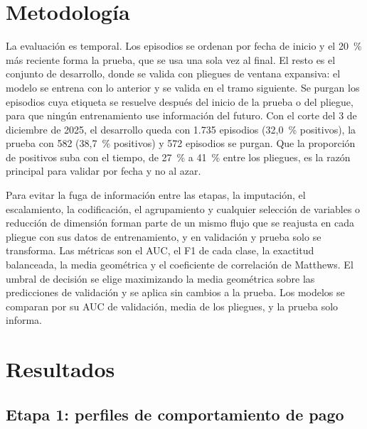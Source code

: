 \documentclass[journal]{IEEEtran}
\begin{document}
\section{Metodología}

La evaluación es temporal. Los episodios se ordenan por fecha de inicio y el 20~\% más reciente forma la prueba, que se usa una sola vez al final. El resto es el conjunto de desarrollo, donde se valida con pliegues de ventana expansiva: el modelo se entrena con lo anterior y se valida en el tramo siguiente. Se purgan los episodios cuya etiqueta se resuelve después del inicio de la prueba o del pliegue, para que ningún entrenamiento use información del futuro. Con el corte del 3 de diciembre de 2025, el desarrollo queda con 1.735 episodios (32,0~\% positivos), la prueba con 582 (38,7~\% positivos) y 572 episodios se purgan. Que la proporción de positivos suba con el tiempo, de 27~\% a 41~\% entre los pliegues, es la razón principal para validar por fecha y no al azar.

Para evitar la fuga de información entre las etapas, la imputación, el escalamiento, la codificación, el agrupamiento y cualquier selección de variables o reducción de dimensión forman parte de un mismo flujo que se reajusta en cada pliegue con sus datos de entrenamiento, y en validación y prueba solo se transforma. Las métricas son el AUC, el F1 de cada clase, la exactitud balanceada, la media geométrica y el coeficiente de correlación de Matthews. El umbral de decisión se elige maximizando la media geométrica sobre las predicciones de validación y se aplica sin cambios a la prueba. Los modelos se comparan por su AUC de validación, media de los pliegues, y la prueba solo informa.

\section{Resultados}

\subsection{Etapa 1: perfiles de comportamiento de pago}
\end{document}

